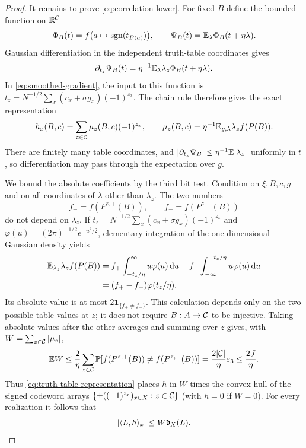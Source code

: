 \begin{proof}
It remains to prove \eqref{eq:correlation-lower}. For fixed $B$ define
the bounded function on $\mathbb R^{\mathcal C}$
\[
 \Phi_B(t)=f\bigl(a\mapsto\operatorname{sgn}(t_{B(a)})\bigr),\qquad
 \Psi_B(t)=\mathbb E_\lambda\Phi_B(t+\eta\lambda).
\]
Gaussian differentiation in the independent truth-table coordinates
gives
\[
 \partial_{t_z}\Psi_B(t)
 =\eta^{-1}\mathbb E_\lambda\lambda_z\Phi_B(t+\eta\lambda).
\]
In \eqref{eq:smoothed-gradient}, the input to this function is
$t_z=N^{-1/2}\sum_x(c_x+\sigma g_x)(-1)^{z_x}$. The chain rule therefore
gives the exact representation
\begin{equation}\label{eq:truth-table-representation}
 h_x(B,c)=\sum_{z\in\mathcal C}\mu_z(B,c)(-1)^{z_x},\qquad
 \mu_z(B,c)=\eta^{-1}\mathbb E_{g,\lambda}\lambda_zf(P(B)).
\end{equation}
There are finitely many table coordinates, and
$|\partial_{t_z}\Psi_B|\le\eta^{-1}\mathbb E|\lambda_z|$ uniformly in $t$,
so differentiation may pass through the expectation over $g$.

We bound the absolute coefficients by the third bit test. Condition on
$\xi,B,c,g$ and on all coordinates of $\lambda$ other than $\lambda_z$.
The two numbers
\[
 f_+=f(P^{z,+}(B)),\qquad f_-=f(P^{z,-}(B))
\]
do not depend on $\lambda_z$. If
$t_z=N^{-1/2}\sum_x(c_x+\sigma g_x)(-1)^{z_x}$ and
$\varphi(u)=(2\pi)^{-1/2}e^{-u^2/2}$, elementary integration of the
one-dimensional Gaussian density yields
\begin{align*}
 \mathbb E_{\lambda_z}\lambda_zf(P(B))
 &=f_+\int_{-t_z/\eta}^{\infty}u\varphi(u)\,\mathrm d u
   +f_-\int_{-\infty}^{-t_z/\eta}u\varphi(u)\,\mathrm d u\\
 &=(f_+-f_-)\varphi(t_z/\eta).
\end{align*}
Its absolute value is at most
$2\mathbf1_{\{f_+\ne f_-\}}$. This calculation depends only on the
two possible table values at $z$; it does not require $B:A\to\mathcal C$ to
be injective. Taking absolute values after the other averages and
summing over $z$ gives, with $W=\sum_{z\in\mathcal C}|\mu_z|$,
\begin{equation}\label{eq:truth-table-mass}
 \mathbb E W\le\frac2\eta\sum_{z\in\mathcal C}
       \mathbb P[f(P^{z,+}(B))\ne f(P^{z,-}(B))]
 =\frac{2|\mathcal C|}\eta\varepsilon_3\le\frac{2J}\eta.
\end{equation}
Thus \eqref{eq:truth-table-representation} places $h$ in $W$ times
the convex hull of the signed codeword arrays
$\{\pm((-1)^{z_x})_{x\in X}:z\in\mathcal C\}$ (with $h=0$ if $W=0$).
For every realization it follows that
\begin{equation}\label{eq:convex-hull-correlation}
 |\langle L,h\rangle_x|\le W\mathfrak d_X(L).
\end{equation}


\end{proof}
